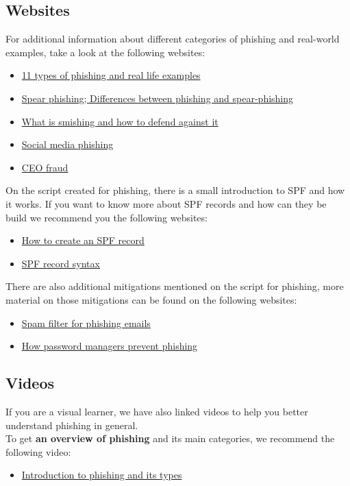 \subsection{Websites}
For additional information about different categories of phishing and real-world examples, take a look at the following websites:
\begin{itemize}
    \item \href{https://www.pandasecurity.com/en/mediacenter/tips/types-of-phishing/}{11 types of phishing and real life examples}
    \item \href{https://digitalguardian.com/blog/what-is-spear-phishing-defining-and-differentiating-spear-phishing-and-phishing}{Spear phishing; Differences between phishing and spear-phishing}
    \item \href{- https://www.kaspersky.com/resource-center/threats/what-is-smishing-and-how-to-defend-against-it}{What is smishing and how to defend against it}
    \item \href{https://www.trendmicro.com/en_vn/what-is/phishing/social-media-phishing.html}{Social media phishing}
    \item \href{- https://www.barracuda.com/glossary/ceo-fraud}{CEO fraud}
\end{itemize}
On the script created for phishing, there is a small introduction to SPF and how it works. If you want to know more about SPF records and how can they be build we recommend you the following websites:
\begin{itemize}
    \item \href{https://www.dmarcanalyzer.com/spf/how-to-create-an-spf-txt-record/}{How to create an SPF record}
    \item \href{https://www.spf-record.com/syntax}{SPF record syntax}
\end{itemize}

There are also additional mitigations mentioned on the script for phishing, more material on those mitigations can be found on the following websites:
\begin{itemize}
    \item \href{https://www.techtarget.com/searchsecurity/definition/spam-filter}{Spam filter for phishing emails}
    \item \href{https://bitwarden.com/blog/how-password-managers-help-prevent-phishing/}{How password managers prevent phishing}
\end{itemize}


\subsection{Videos}
If you are a visual learner, we have also linked videos to help you better understand phishing in general. \\
To get \textbf{an overview of phishing} and its main categories, we recommend the following video: 
\begin{itemize}
    \item \href{https://www.youtube.com/watch?v=rb26NK0jtHM}{Introduction to phishing and its types}
\end{itemize}

